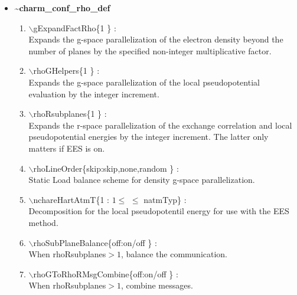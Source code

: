 \begin{itemize}
\clearpage
\huge
\item[] {\bf \~{ }charm\_conf\_rho\_def}
\begin{enumerate}
  \vspace{0.15in} \Large
  \item $\backslash$gExpandFactRho\{1 \} : \\    \large
  Expands the g-space parallelization of the electron density beyond
  the number of planes by the specified non-integer multiplicative factor. 
  \vspace{0.15in} \Large
  \item $\backslash$rhoGHelpers\{1 \} : \\    \large
  Expands the g-space parallelization of the local pseudopotential
  evaluation by the integer increment.
  \vspace{0.15in} \Large
  \item $\backslash$rhoRsubplanes\{1 \} : \\    \large
  Expands the r-space parallelization of the exchange correlation and 
  local pseudopotential energies by the integer increment. 
  The latter only matters if EES is on.
  \vspace{0.15in} \Large
  \item $\backslash$rhoLineOrder\{skip:skip,none,random \} : \\    \large
  Static Load balance scheme for density g-space parallelization.
  \vspace{0.15in} \Large
  \item $\backslash$nchareHartAtmT\{1 : $1 \leq$ $\leq$ natmTyp\} : \\ \large
  Decomposition for the local pseudopotentil energy for use with the 
  EES method.
  \vspace{0.15in} \Large
  \item $\backslash$rhoSubPlaneBalance\{off:on/off \} : \\    \large
  When rhoRsubplanes$>1$, balance the communication.
  \vspace{0.15in} \Large
  \item $\backslash$rhoGToRhoRMsgCombine\{off:on/off \} : \\    \large
  When rhoRsubplanes$>1$, combine messages.
\end{enumerate}


\end{itemize}
